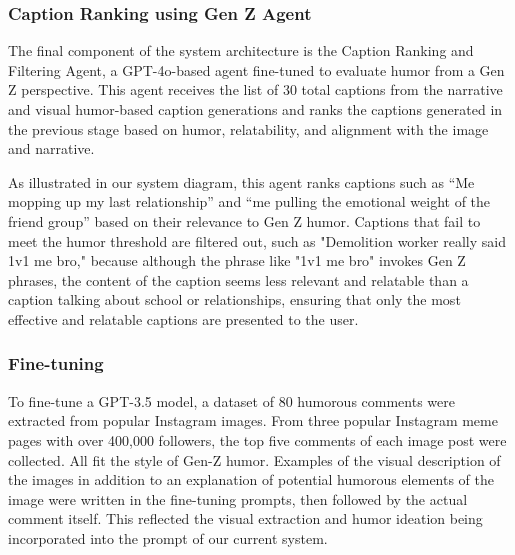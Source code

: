 \subsubsection{Caption Ranking using Gen Z Agent}

The final component of the system architecture is the Caption Ranking and Filtering Agent, a GPT-4o-based agent fine-tuned to evaluate humor from a Gen Z perspective. This agent receives the list of 30 total captions from the narrative and visual humor-based caption generations and ranks the captions generated in the previous stage based on humor, relatability, and alignment with the image and narrative.

As illustrated in our system diagram, this agent ranks captions such as “Me mopping up my last relationship” and “me pulling the emotional weight of the friend group” based on their relevance to Gen Z humor. Captions that fail to meet the humor threshold are filtered out, such as "Demolition worker really said 1v1 me bro," because although the phrase like "1v1 me bro" invokes Gen Z phrases, the content of the caption seems less relevant and relatable than a caption talking about school or relationships, ensuring that only the most effective and relatable captions are presented to the user.

\subsubsection{Fine-tuning}

To fine-tune a GPT-3.5 model, a dataset of 80 humorous comments were extracted from popular Instagram images. From three popular Instagram meme pages with over 400,000 followers, the top five comments of each image post were collected. All fit the style of Gen-Z humor. 
Examples of the visual description of the images in addition to an explanation of potential humorous elements of the image were written in the fine-tuning prompts, then followed by the actual comment itself. This reflected the visual extraction and humor ideation being incorporated into the prompt of our current system.


